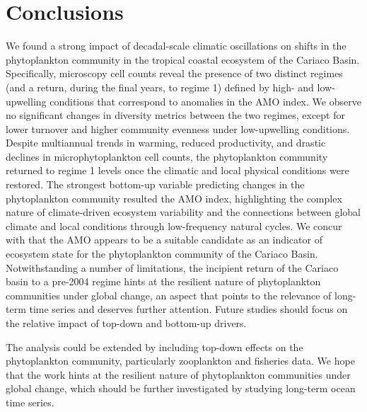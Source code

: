 \documentclass[draft]{agujournal2019}
\begin{document}
\section{Conclusions}
We found a strong impact of decadal-scale climatic oscillations on shifts in the phytoplankton community in the tropical coastal ecosystem of the Cariaco Basin. Specifically, microscopy cell counts reveal the presence of two distinct regimes (and a return, during the final years, to regime 1) defined by high- and low-upwelling conditions that correspond to anomalies in the AMO index. We observe no significant changes in diversity metrics between the two regimes, except for lower turnover and higher community evenness under low-upwelling conditions.
Despite multiannual trends in warming, reduced productivity, and drastic declines in microphytoplankton cell counts, the phytoplankton community returned to regime 1 levels once the climatic and local physical conditions were restored. 
The strongest bottom-up variable predicting changes in the phytoplankton community resulted the AMO index, highlighting the complex nature of climate-driven ecosystem variability and the connections between global climate and local conditions through low-frequency natural cycles. We concur with  that the AMO appears to be a suitable candidate as an indicator of ecosystem state for the phytoplankton community of the Cariaco Basin. 
Notwithstanding a number of limitations, the incipient return of the Cariaco basin to a pre-2004 regime hints at the resilient nature of phytoplankton communities under global change, an aspect that points to the relevance of long-term time series and deserves further attention. 
Future studies should focus on the relative impact of top-down and bottom-up drivers.

The analysis could be extended by including top-down effects on the phytoplankton community, particularly zooplankton and fisheries data. 
We hope that the work hints at the resilient nature of phytoplankton communities under global change, which should be further investigated by studying long-term ocean time series.






\end{document}
